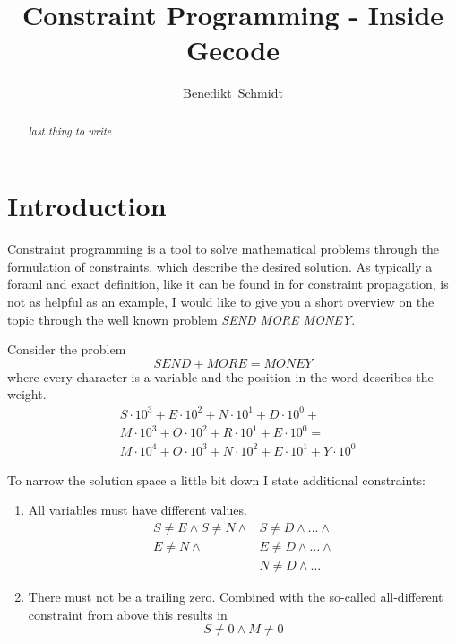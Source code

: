 \documentclass[10pt,
               a4paper,
               journal,
               ]{IEEEtran}
\makeatletter
\def\markboth#1#2{\def\leftmark{\@IEEEcompsoconly{\sffamily}\MakeUppercase{\protect#1}}%
\def\rightmark{\@IEEEcompsoconly{\sffamily}\MakeUppercase{\protect#2}}}
\makeatother
\begin{document}
	\title{Constraint Programming - Inside Gecode}
	\author{Benedikt~Schmidt}
	\markboth{Advanced Seminar for Security in Information Technology, Summer Term 2014}%
	{Benedikt Schmidt: Constraint Programming - Inside Gecode}	
	\maketitle	
	
	\begin{abstract}	
		\textit{last thing to write}	
	\end{abstract}
	
	\section{Introduction}
	Constraint programming is a tool to solve mathematical problems through the formulation of constraints, which describe the desired solution. As typically a foraml and exact definition, like it can be found in \cite[p.~16]{handbookCP} for constraint propagation, is not as helpful as an example, I would like to give you a short overview on the topic through the well known problem \emph{SEND MORE MONEY}.
	
	Consider the problem
	\[SEND + MORE = MONEY\]
	where every character is a variable and the position in the word describes the weight.
	\begin{equation}
	\label{eq:linearConstraint}
	\begin{split}
		& S \cdot 10^3 + E \cdot 10^2 + N \cdot 10^1 + D \cdot 10^0 + \\ 
		& M \cdot 10^3 + O \cdot 10^2 + R \cdot 10^1 + E \cdot 10^0 = \\ 
		& M \cdot 10^4 + O \cdot 10^3 + N \cdot 10^2 + E \cdot 10^1 + Y \cdot 10^0
	\end{split}
	\end{equation}		
	
	To narrow the solution space a little bit down I state additional constraints:
	\begin{enumerate}
	\item All variables must have different values.
		\begin{equation}
		\begin{split}
			S \ne E \land S \ne N \land & S \ne D \land \dots \land \\
			E \ne N \land & E \ne D \land \dots \land \\
			& N \ne D \land \dots
		\end{split}
		\end{equation}	
	\item There must not be a trailing zero. Combined with the so-called all-different constraint \cite{allDifferent} from above this results in
		\begin{equation}
			S \ne 0 \land M \ne 0
		\end{equation}
	\end{enumerate}
	
\end{document}
